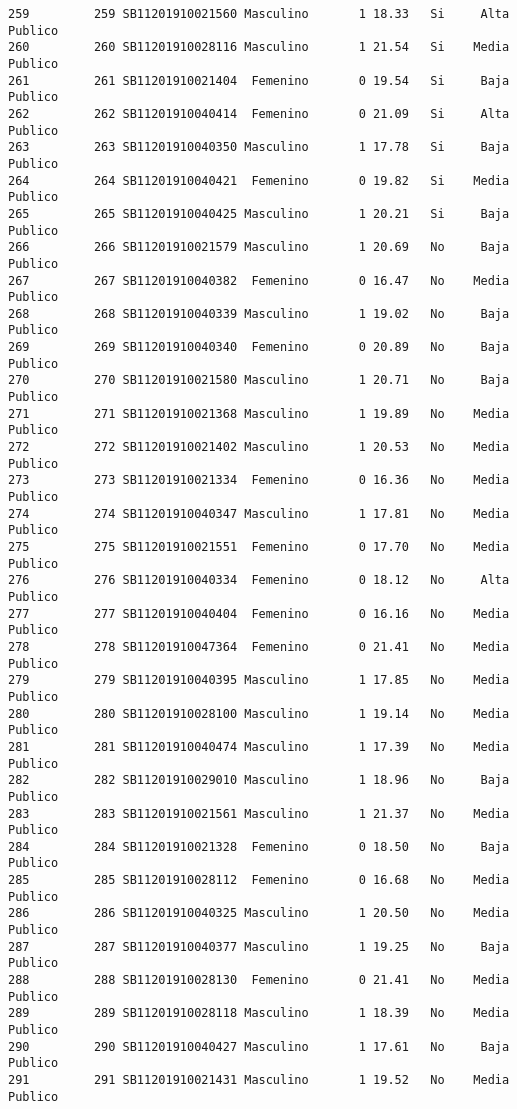 \documentclass[
  letterpaper,
  DIV=11,
  numbers=noendperiod]{scrartcl}
\begin{document}
\begin{verbatim}
259         259 SB11201910021560 Masculino       1 18.33   Si     Alta Publico
260         260 SB11201910028116 Masculino       1 21.54   Si    Media Publico
261         261 SB11201910021404  Femenino       0 19.54   Si     Baja Publico
262         262 SB11201910040414  Femenino       0 21.09   Si     Alta Publico
263         263 SB11201910040350 Masculino       1 17.78   Si     Baja Publico
264         264 SB11201910040421  Femenino       0 19.82   Si    Media Publico
265         265 SB11201910040425 Masculino       1 20.21   Si     Baja Publico
266         266 SB11201910021579 Masculino       1 20.69   No     Baja Publico
267         267 SB11201910040382  Femenino       0 16.47   No    Media Publico
268         268 SB11201910040339 Masculino       1 19.02   No     Baja Publico
269         269 SB11201910040340  Femenino       0 20.89   No     Baja Publico
270         270 SB11201910021580 Masculino       1 20.71   No     Baja Publico
271         271 SB11201910021368 Masculino       1 19.89   No    Media Publico
272         272 SB11201910021402 Masculino       1 20.53   No    Media Publico
273         273 SB11201910021334  Femenino       0 16.36   No    Media Publico
274         274 SB11201910040347 Masculino       1 17.81   No    Media Publico
275         275 SB11201910021551  Femenino       0 17.70   No    Media Publico
276         276 SB11201910040334  Femenino       0 18.12   No     Alta Publico
277         277 SB11201910040404  Femenino       0 16.16   No    Media Publico
278         278 SB11201910047364  Femenino       0 21.41   No    Media Publico
279         279 SB11201910040395 Masculino       1 17.85   No    Media Publico
280         280 SB11201910028100 Masculino       1 19.14   No    Media Publico
281         281 SB11201910040474 Masculino       1 17.39   No    Media Publico
282         282 SB11201910029010 Masculino       1 18.96   No     Baja Publico
283         283 SB11201910021561 Masculino       1 21.37   No    Media Publico
284         284 SB11201910021328  Femenino       0 18.50   No     Baja Publico
285         285 SB11201910028112  Femenino       0 16.68   No    Media Publico
286         286 SB11201910040325 Masculino       1 20.50   No    Media Publico
287         287 SB11201910040377 Masculino       1 19.25   No     Baja Publico
288         288 SB11201910028130  Femenino       0 21.41   No    Media Publico
289         289 SB11201910028118 Masculino       1 18.39   No    Media Publico
290         290 SB11201910040427 Masculino       1 17.61   No     Baja Publico
291         291 SB11201910021431 Masculino       1 19.52   No    Media Publico

\end{verbatim}
\end{document}
